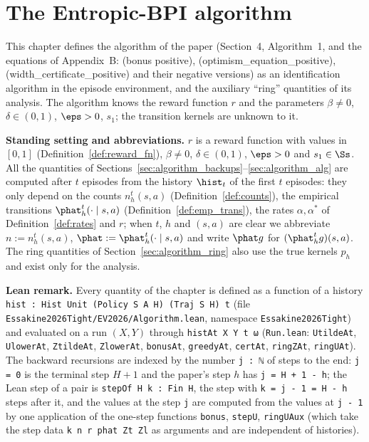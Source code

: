 \chapter{The Entropic-BPI algorithm}
\label{chap:algorithm}

This chapter defines the algorithm of the paper (Section~4, Algorithm~1, and the equations of
Appendix~B: (bonus positive), (optimism\_equation\_positive), (width\_certificate\_positive)
and their negative versions) as an identification algorithm in the episode environment, and
the auxiliary ``ring'' quantities of its analysis. The algorithm knows the reward function
$r$ and the parameters $\beta \ne 0$, $\delta \in (0, 1)$, $\eps > 0$, $s_1$; the transition
kernels are unknown to it.

\textbf{Standing setting and abbreviations.} $r$ is a reward function with values in $[0, 1]$
(Definition~\ref{def:reward_fn}), $\beta \ne 0$, $\delta \in (0, 1)$, $\eps > 0$ and $s_1 \in \Ss$.
All the quantities of Sections~\ref{sec:algorithm_backups}--\ref{sec:algorithm_alg} are
computed after $t$ episodes from the history $\hist_t$ of the first $t$ episodes: they only
depend on the counts $n_h^t(s, a)$ (Definition~\ref{def:counts}), the empirical transitions
$\phat_h^t(\cdot \mid s, a)$ (Definition~\ref{def:emp_trans}), the rates $\alpha, \alpha^*$ of
Definition~\ref{def:rates} and $r$; when $t$, $h$ and $(s, a)$ are clear we abbreviate
$n := n_h^t(s, a)$, $\phat := \phat_h^t(\cdot \mid s, a)$ and write $\phat g$ for
$(\phat_h^t g)(s, a)$. The ring quantities of Section~\ref{sec:algorithm_ring} also use the true
kernels $p_h$ and exist only for the analysis.

\textbf{Lean remark.} Every quantity of the chapter is defined as a function of a history
\texttt{hist : Hist Unit (Policy S A H) (Traj S H) t} (file \texttt{Essakine2026Tight/EV2026/Algorithm.lean},
namespace \texttt{Essakine2026Tight}) and evaluated on a run $(X, Y)$ through
\texttt{histAt X Y t ω} (\texttt{Run.lean}: \texttt{UtildeAt}, \texttt{UlowerAt},
\texttt{ZtildeAt}, \texttt{ZlowerAt}, \texttt{bonusAt}, \texttt{greedyAt}, \texttt{certAt},
\texttt{ringZAt}, \texttt{ringUAt}). The backward recursions are indexed by the number
\texttt{j : ℕ} of steps to the end: \texttt{j = 0} is the terminal step $H + 1$ and the paper's
step $h$ has \texttt{j = H + 1 - h}; the Lean step of a pair is \texttt{stepOf H k : Fin H}, the
step with \texttt{k = j - 1 = H - h} steps after it, and the values at the step \texttt{j} are
computed from the values at \texttt{j - 1} by one application of the one-step functions
\texttt{bonus}, \texttt{stepU}, \texttt{ringUAux} (which take the step data
\texttt{k n r phat Zt Zl} as arguments and are independent of histories).

